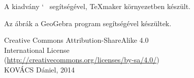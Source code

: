 
\newpage
\thispagestyle{empty}
\null\vfill
\begin{center}
  A kiadv\'{a}ny \AmS{}`~\LaTeXe{} seg\'{i}ts\'{e}g\'{e}vel, \TeX{}maker
  k\"{o}rnyezetben k\'{e}sz\"{u}lt.
	
  Az \'{a}br\'{a}k a GeoGebra program seg\'{i}ts\'{e}g\'{e}vel
  k\'{e}sz\"{u}ltek.\\[4ex]	
	
  {\Large\cc\bysa}
  
  Creative Commons Attribution-ShareAlike 4.0\\
  International License\\
  (\url{http://creativecommons.org/licenses/by-sa/4.0/})\\[4ex]
  
  KOV\'{A}CS D\'{a}niel, 2014
\end{center} 